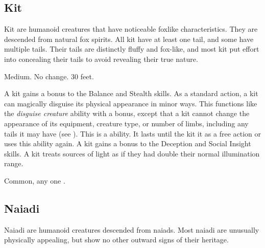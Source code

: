     \subsection{Kit}

        Kit are humanoid creatures that have noticeable foxlike characteristics.
        They are descended from natural fox spirits.
        All kit have at least one tail, and some have multiple tails.
        Their tails are distinctly fluffy and fox-like, and most kit put effort into concealing their tails to avoid revealing their true nature.

         Medium.
         No change.
         30 feet.
        \begin{itemize}
             A kit gains a  bonus to the Balance and Stealth skills.
             As a standard action, a kit can magically disguise its physical appearance in minor ways.
                This functions like the \textit{disguise creature} ability with a  bonus, except that a kit cannot change the appearance of its equipment, creature type, or number of limbs, including any tails it may have (see ).
                This is a  ability.
                It lasts until the kit  it as a free action or uses this ability again.
             A kit gains a  bonus to the Deception and Social Insight skills.
             A kit treats sources of light as if they had double their normal illumination range.
        \end{itemize}
         Common, any one .

    \subsection{Naiadi}

        Naiadi are humanoid creatures descended from naiads.
        Most naiadi are unusually physically appealing, but show no other outward signs of their heritage.

